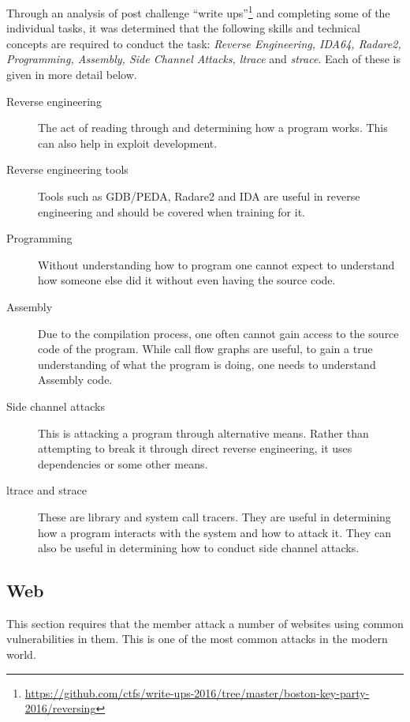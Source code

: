 \documentclass[a4paper,11pt]{report}
\begin{document}
			Through an analysis of post challenge ``write ups''\footnote{\url{https://github.com/ctfs/write-ups-2016/tree/master/boston-key-party-2016/reversing}}
			and completing some of the individual tasks, 
			it was determined that the following skills and technical concepts are required to conduct the task: 
			\textit{Reverse Engineering, IDA64, Radare2, Programming, Assembly, Side Channel Attacks, ltrace} and \textit{strace}.
			Each of these is given in more detail below. 
			\begin{description}
				\item[Reverse engineering] 
					The act of reading through and determining how a program works. 
					This can also help in exploit development. 
				\item[Reverse engineering tools] 
					Tools such as GDB/PEDA, Radare2 and IDA are useful in reverse engineering and should be covered when training for it. 
				\item[Programming] 
					Without understanding how to program one cannot expect to understand how someone else did it without even having the source code. 
				\item[Assembly] 
					Due to the compilation process, one often cannot gain access to the source code of the program. 
					While call flow graphs are useful, to gain a true understanding of what the program is doing, one needs to understand Assembly code. 
				\item[Side channel attacks] 
					This is attacking a program through alternative means. 
					Rather than attempting to break it through direct reverse engineering, it uses dependencies or some other means. 
				\item[ltrace and strace] 
					These are library and system call tracers. 
					They are useful in determining how a program interacts with the system and how to attack it. 
					They can also be useful in determining how to conduct side channel attacks. 
			\end{description}
		\subsection{Web}
			This section requires that the member attack a number of websites using common vulnerabilities in them. 
			This is one of the most common attacks in the modern world. 
\end{document}
